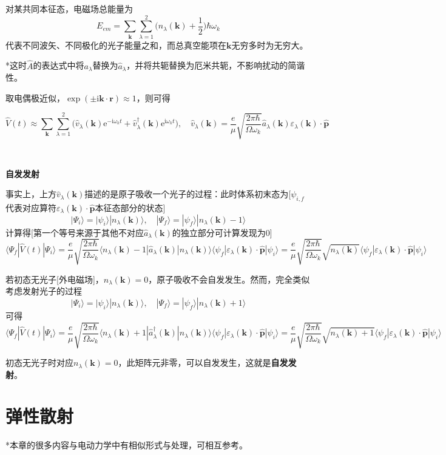 \documentclass[a4paper,UTF8,fontset=windows]{ctexart}
\newcommand*{\ir}{\mathrm{i}}
\newcommand*{\er}{\mathrm{e}}
\newcommand*{\ket}[1]{|#1\rangle}
\newcommand*{\blk}[3]{\langle#1|#2|#3\rangle}
\newcommand*{\br}{\mathbf{r}}
\newcommand*{\bp}{\mathbf{p}}
\begin{document}
对某共同本征态，电磁场总能量为
$$E_{em}=\sum_{\mathbf{k}}\sum_{\lambda=1}^2\bigg(n_\lambda(\mathbf{k})+\frac{1}{2}\bigg)\hbar\omega_k$$
代表不同波矢、不同极化的光子能量之和，而总真空能项在$\mathbf{k}$无穷多时为无穷大。

*这时$\hat{A}$的表达式中将$a_\lambda$替换为$\hat{a}_\lambda$，并将共轭替换为厄米共轭，不影响扰动的简谐性。

取电偶极近似，$\exp(\pm\ir\mathbf{k}\cdot\br)\approx1$，则可得

$$\hat{V}(t)\approx\sum_\mathbf{k}\sum_{\lambda=1}^2\big(\hat{v}_\lambda(\mathbf{k})\er^{-\ir\omega_kt}+\hat{v}_\lambda^\dagger(\mathbf{k})\er^{\ir\omega_kt}\big),\quad\hat{v}_\lambda(\mathbf{k})=\frac{e}{\mu}\sqrt{\frac{2\pi\hbar}{\Omega\omega_k}}\hat{a}_\lambda(\mathbf{k})\varepsilon_\lambda(\mathbf{k})\cdot\hat{\bp}$$

\

\textbf{自发发射}

事实上，上方$\hat{v}_\lambda(\mathbf{k})$描述的是原子吸收一个光子的过程：此时体系初末态为[$\psi_{i,f}$代表对应算符$\varepsilon_\lambda(\mathbf{k})\cdot\hat{\bp}$本征态部分的状态]
$$\ket{\Psi_i}=\ket{\psi_i}\ket{n_\lambda(\mathbf{k})},\quad\ket{\Psi_f}=\ket{\psi_f}\ket{n_\lambda(\mathbf{k})-1}$$
计算得[第一个等号来源于其他不对应$\hat{a}_\lambda(\mathbf{k})$的独立部分可计算发现为0]
$$\blk{\Psi_f}{\hat{V}(t)}{\Psi_i}=\frac{e}{\mu}\sqrt{\frac{2\pi\hbar}{\Omega\omega_k}}\blk{n_\lambda(\mathbf{k})-1}{\hat{a}_\lambda(\mathbf{k})}{n_\lambda(\mathbf{k})}\blk{\psi_f}{\varepsilon_\lambda(\mathbf{k})\cdot\hat{\bp}}{\psi_i}=\frac{e}{\mu}\sqrt{\frac{2\pi\hbar}{\Omega\omega_k}}\sqrt{n_\lambda(\mathbf{k})}\blk{\psi_f}{\varepsilon_\lambda(\mathbf{k})\cdot\hat{\bp}}{\psi_i}$$

若初态无光子[外电磁场]，$n_\lambda(\mathbf{k})=0$，原子吸收不会自发发生。然而，完全类似考虑发射光子的过程
$$\ket{\Psi_i}=\ket{\psi_i}\ket{n_\lambda(\mathbf{k})},\quad\ket{\Psi_f}=\ket{\psi_f}\ket{n_\lambda(\mathbf{k})+1}$$
可得
$$\blk{\Psi_f}{\hat{V}(t)}{\Psi_i}=\frac{e}{\mu}\sqrt{\frac{2\pi\hbar}{\Omega\omega_k}}\blk{n_\lambda(\mathbf{k})+1}{\hat{a}_\lambda^\dagger(\mathbf{k})}{n_\lambda(\mathbf{k})}\blk{\psi_f}{\varepsilon_\lambda(\mathbf{k})\cdot\hat{\bp}}{\psi_i}=\frac{e}{\mu}\sqrt{\frac{2\pi\hbar}{\Omega\omega_k}}\sqrt{n_\lambda(\mathbf{k})+1}\blk{\psi_f}{\varepsilon_\lambda(\mathbf{k})\cdot\hat{\bp}}{\psi_i}$$

初态无光子时对应$n_\lambda(\mathbf{k})=0$，此矩阵元非零，可以自发发生，这就是\textbf{自发发射}。

\section{弹性散射}
*本章的很多内容与电动力学中有相似形式与处理，可相互参考。
\end{document}
